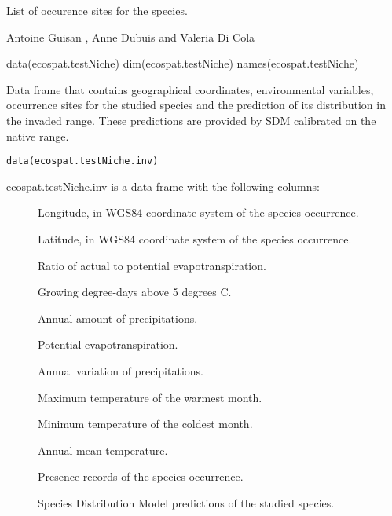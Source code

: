 \documentclass[a4paper]{book}
\begin{document}
%
\begin{Details}\relax
List of occurence sites for the species.
\end{Details}
%
\begin{Author}\relax
Antoine Guisan , Anne Dubuis  and Valeria Di Cola 
\end{Author}
%
\begin{SeeAlso}\relax
{}
\end{SeeAlso}
%
\begin{Examples}
\begin{ExampleCode}
data(ecospat.testNiche)
dim(ecospat.testNiche)
names(ecospat.testNiche)
\end{ExampleCode}
\end{Examples}
%
\begin{Description}\relax
Data frame that contains geographical coordinates, environmental variables, occurrence sites for the studied species and the prediction of its distribution in the invaded range. These predictions are provided by SDM calibrated on the native range.
\end{Description}
%
\begin{Usage}
\begin{verbatim}
data(ecospat.testNiche.inv)
\end{verbatim}
\end{Usage}
%
\begin{Format}
ecospat.testNiche.inv is a data frame with the following columns:
\begin{description}

\item[] Longitude, in WGS84 coordinate system of the species occurrence.
\item[] Latitude, in WGS84 coordinate system of the species occurrence.
\item[] Ratio of actual to potential evapotranspiration.
\item[] Growing degree-days above 5 degrees C.
\item[] Annual amount of precipitations.
\item[] Potential evapotranspiration.
\item[] Annual variation of precipitations.
\item[] Maximum temperature of the warmest month.
\item[] Minimum temperature of the coldest month.
\item[] Annual mean temperature.
\item[] Presence records of the species occurrence.
\item[] Species Distribution Model predictions of the studied species.

\end{description}

\end{Format}
\end{document}
